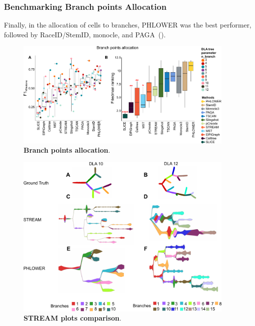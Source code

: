 \subsubsection{Benchmarking Branch points Allocation}
Finally, in the allocation of cells to branches, PHLOWER was the best performer, followed by RaceID/StemID, monocle, and PAGA~().
\begin{figure}[!h]
	\centering
	\includegraphics[width=0.95\textwidth]{F1milestone/fig}
	\vspace{0.1cm}
	\caption[Branch points allocation]{
	\textbf{Branch points allocation}.}
	\label{fig:f1milestone}
\end{figure}

\begin{figure}[!h]
	\centering
	\includegraphics[width=0.95\textwidth]{PHLOWER_STREAM_layout/fig}
	\vspace{0.1cm}
	\caption[STREAM plots comparison]{
	\textbf{STREAM plots comparison}.}
	\label{fig:PHLOWER_STREAM}
\end{figure}

